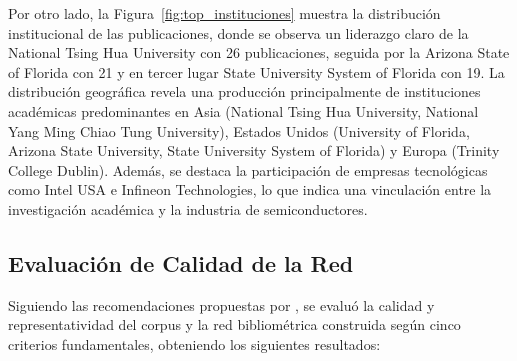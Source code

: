 \documentclass[twoside, twocolumn]{article}
\newcommand{\1}{\mathds{1}}						%
\begin{document}
Por otro lado, la Figura~\ref{fig:top_instituciones} muestra la distribución institucional de las publicaciones, donde se observa un liderazgo claro de la National Tsing Hua University con 26 publicaciones, seguida por la Arizona State of Florida con 21 y en tercer lugar State University System of Florida con 19. La distribución geográfica revela una producción principalmente de instituciones académicas predominantes en Asia (National Tsing Hua University, National Yang Ming Chiao Tung University), Estados Unidos (University of Florida, Arizona State University, State University System of Florida) y Europa (Trinity College Dublin). Además, se destaca la participación de empresas tecnológicas como Intel USA e Infineon Technologies, lo que indica una vinculación entre la investigación académica y la industria de semiconductores.

\subsection{Evaluación de Calidad de la Red}

Siguiendo las recomendaciones propuestas por \cite{Donthu2021}, se evaluó la calidad y representatividad del corpus y la red bibliométrica construida según cinco criterios fundamentales, obteniendo los siguientes resultados:
\end{document}
